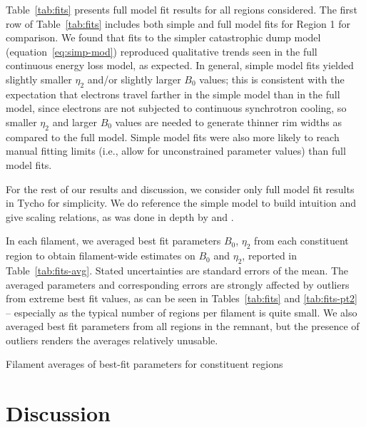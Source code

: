 \documentclass[iop, apj, numberedappendix, twocolappendix]{emulateapj}
\begin{document}
Table~\ref{tab:fits} presents full model fit results for all regions
considered.  The first row of Table~\ref{tab:fits} includes both simple and
full model fits for Region 1 for comparison.
We found that fits to the simpler catastrophic dump model
(equation~\eqref{eq:simp-mod}) reproduced qualitative trends seen in the full
continuous energy loss model, as expected.  In general, simple model fits
yielded slightly smaller $\eta_2$ and/or slightly larger $B_0$ values; this is
consistent with the expectation that electrons travel farther in the simple
model than in the full model, since electrons are not subjected to continuous
synchrotron cooling, so smaller $\eta_2$ and larger $B_0$ values are needed to
generate thinner rim widths as compared to the full model.  Simple model fits
were also more likely to reach manual fitting limits (i.e., allow for
unconstrained parameter values) than full model fits.

For the rest of our results and discussion, we consider only full model
fit results in Tycho for simplicity.  We do reference the simple model to build
intuition and give scaling relations, as was done in depth by
\citet{parizot2006} and .

In each filament, we averaged best fit parameters $B_0$, $\eta_2$ from each
constituent region to obtain filament-wide estimates on $B_0$ and $\eta_2$,
reported in Table~\ref{tab:fits-avg}.  Stated uncertainties are standard errors
of the mean.  The averaged parameters and corresponding errors are strongly
affected by outliers from extreme best fit values, as can be seen in
Tables~\ref{tab:fits} and \ref{tab:fits-pt2} -- especially as the typical
number of regions per filament is quite small.  We also averaged best fit
parameters from all regions in the remnant, but the presence of outliers
renders the averages relatively unusable.

\begin{table*}[ht]
    \scriptsize
    \centering
    \caption{Filament averages of best-fit parameters for constituent regions
    \label{tab:fits-avg}}
    
\end{table*}

\section{Discussion}
\end{document}

